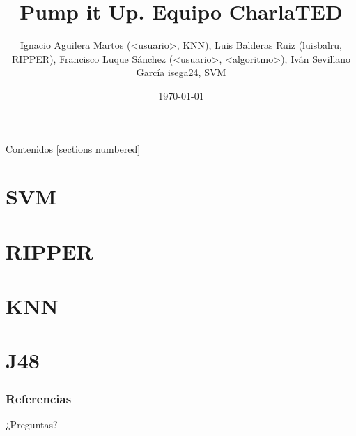 \documentclass[10pt]{beamer}
\title{Pump it Up. Equipo CharlaTED}
\author{Ignacio Aguilera Martos (<usuario>, KNN), Luis Balderas Ruiz (luisbalru, RIPPER), Francisco Luque Sánchez (<usuario>, <algoritmo>), Iván Sevillano García isega24, SVM}
\date{\today}
\institute{Preprocesamiento y Clasificación}
\begin{document}
\maketitle

\begin{frame}[fragile]{Contenidos}
[sections numbered]
\tableofcontents[hideallsubsections]
\end{frame}

\section{SVM}


\section{RIPPER}


\section{KNN}


\section{J48}


\begin{frame}[allowframebreaks]
\frametitle{Referencias}


\end{frame}

\begin{frame}[standout]
\LARGE{¿Preguntas?}
\vspace{10px}

\end{frame}
\end{document}
